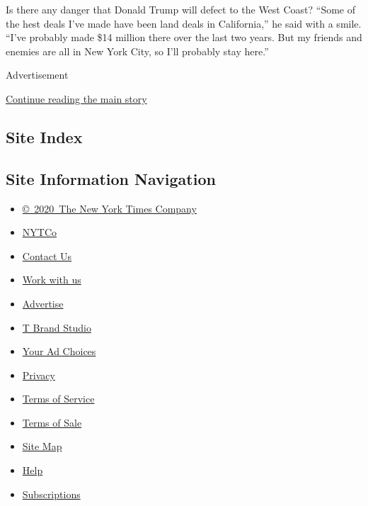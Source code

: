 Is there any danger that Donald Trump will defect to the West Coast?
``Some of the hest deals I've made have been land deals in California,''
he said with a smile. ``I've probably made \$14 million there over the
last two years. But my friends and enemies are all in New York City, so
I'll probably stay here.''

Advertisement

\protect\hyperlink{after-bottom}{Continue reading the main story}

\hypertarget{site-index}{%
\subsection{Site Index}\label{site-index}}

\hypertarget{site-information-navigation}{%
\subsection{Site Information
Navigation}\label{site-information-navigation}}

\begin{itemize}
\tightlist
\item
  \href{https://help.nytimes.com/hc/en-us/articles/115014792127-Copyright-notice}{©~2020~The
  New York Times Company}
\end{itemize}

\begin{itemize}
\tightlist
\item
  \href{https://www.nytco.com/}{NYTCo}
\item
  \href{https://help.nytimes.com/hc/en-us/articles/115015385887-Contact-Us}{Contact
  Us}
\item
  \href{https://www.nytco.com/careers/}{Work with us}
\item
  \href{https://nytmediakit.com/}{Advertise}
\item
  \href{http://www.tbrandstudio.com/}{T Brand Studio}
\item
  \href{https://www.nytimes.com/privacy/cookie-policy\#how-do-i-manage-trackers}{Your
  Ad Choices}
\item
  \href{https://www.nytimes.com/privacy}{Privacy}
\item
  \href{https://help.nytimes.com/hc/en-us/articles/115014893428-Terms-of-service}{Terms
  of Service}
\item
  \href{https://help.nytimes.com/hc/en-us/articles/115014893968-Terms-of-sale}{Terms
  of Sale}
\item
  \href{https://spiderbites.nytimes.com}{Site Map}
\item
  \href{https://help.nytimes.com/hc/en-us}{Help}
\item
  \href{https://www.nytimes.com/subscription?campaignId=37WXW}{Subscriptions}
\end{itemize}
